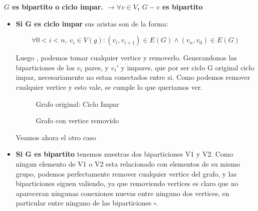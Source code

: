 \documentclass{article}
\begin{document}
\textbf{$G$ es bipartito o ciclo impar. $\rightarrow \forall v \in V$, $G-v$ es bipartito} 
\begin{itemize}
\item \textbf{Si G es ciclo impar} sus aristas son de la forma:

\[\forall 0 < i < n,\ v_i \in V(g) : (v_i,v_{i+1}) \in E(G) \land   (v_n,v_0) \in E(G) \]

Luego , podemos tomar cualquier vertice y removerlo. Generandonos las biparticiones de los $v_i$  pares,  y $v_i'$ y impares, que por ser ciclo G original ciclo impar, necesariamente no estan conectados entre si. Como podemos remover cualquier vertice y esto vale, se cumple lo que queriamos ver.

\begin{figure}[h]
\centering
\begin{minipage}{0.4\textwidth}
\centering
{}
\caption*{Grafo original: Ciclo Impar}
\end{minipage}
\hspace{1cm}
\begin{minipage}{0.4\textwidth}
\centering
{}
\caption*{Grafo con vertice removido}
\end{minipage}
\end{figure}
\begin{center}
Veamos ahora el otro caso
\end{center}
\newpage
\item \textbf{Si G es bipartito} tenemos nuestras dos biparticiones V1 y V2. Como ningun elemento de V1 o V2 esta relacionado con elementos de su mismo grupo, podemos perfectamente remover cualquier vertice del grafo, y las biparticiones siguen valiendo, ya que removiendo vertices es claro que no apareceran ningunas conexiones nuevas entre ninguno dos vertices, en particular entre ninguno de las biparticiones $\square$.


\end{itemize}
\end{document}
